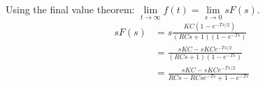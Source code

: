 \documentclass[11pt]{article}
\begin{document}
Using the final value theorem: $\lim\limits_{t\to \infty} f(t) = \lim\limits_{s\to 0} sF(s)$.
\begin{subequations}
  \begin{align}
    sF(s) &= s\frac{KC(1-e^{-Ts/2})}{(RCs + 1)(1-e^{-Ts})} \\
    &= \frac{sKC - sKCe^{-Ts/2}}{(RCs + 1)(1-e^{-Ts})} \\
    &= \frac{sKC - sKCe^{-Ts/2}}{RCs - RCse^{-Ts} + 1 - e^{-Ts}}
  \end{align}
\end{subequations}

\end{document}
